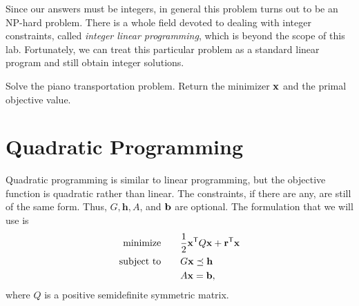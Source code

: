 \begin{info}
Since our answers must be integers, in general this problem turns out to be an NP-hard problem.
There is a whole field devoted to dealing with integer constraints, called \emph{integer linear programming}, which is beyond the scope of this lab.
Fortunately, we can treat this particular problem as a standard linear program and still obtain integer solutions.
\end{info}

\begin{problem}
Solve the piano transportation problem. %
Return the minimizer $\mathbf{x}$ and the primal objective value.
\end{problem}

\section*{Quadratic Programming}

Quadratic programming is similar to linear programming, but the objective function is quadratic rather than linear.
The constraints, if there are any, are still of the same form.
Thus, $G, \mathbf{h}, A$, and $\mathbf{b}$ are optional.
The formulation that we will use is
\begin{align*}
\text{minimize}\qquad &\frac{1}{2}\mathbf{x}^{\mathsf T} Q\mathbf{x} + \mathbf{r}^{\mathsf T} \mathbf{x} \\
\text{subject to}\qquad &G\mathbf{x} \preceq \mathbf{h}\\
 &A\mathbf{x} = \mathbf{b},
\end{align*}
where $Q$ is a positive semidefinite symmetric matrix.

